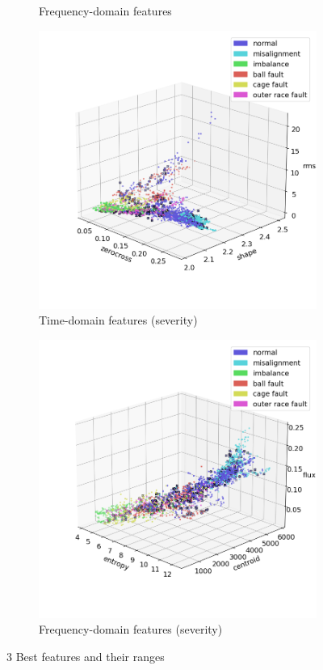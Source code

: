 \begin{figure}[ht]
\begin{subfigure}[b]{0.48\textwidth}
        \caption{Frequency-domain features}
    \end{subfigure}
    \hfill
    \begin{subfigure}[b]{0.48\textwidth}
        \includegraphics[width=\textwidth]{assets/results/labels/TD-severity.png}
        \caption{Time-domain features (severity)}
    \end{subfigure}
    \hfill
    \begin{subfigure}[b]{0.48\textwidth}
        \includegraphics[width=\textwidth]{assets/results/labels/FD-severity.png}
        \caption{Frequency-domain features (severity)}
    \end{subfigure} 
    \caption{3 Best features and their ranges}
\end{figure}
 
